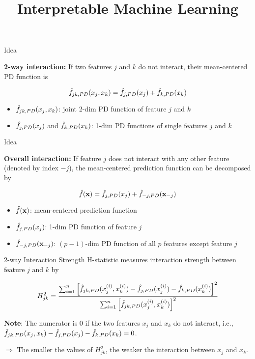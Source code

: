\documentclass[10pt,compress,t,notes=noshow, xcolor=table]{beamer}
\title{Interpretable Machine Learning}
\date{}
\begin{document}


\begin{frame}{Idea }

    \textbf{2-way interaction:} If two features $j$ and $k$ do not interact, their mean-centered PD function is

	$$\hat{f}_{jk, PD}(x_j, x_k) = \hat{f}_{j, PD}(x_j) + \hat{f}_{k, PD}(x_k)$$

\begin{itemize}
	\item $\hat{f}_{jk, PD}(x_j, x_k)$: joint 2-dim PD function of feature $j$ and $k$
	\item $\hat{f}_{j, PD}(x_j)$ and $\hat{f}_{k, PD}(x_k)$: 1-dim PD functions of single features $j$ and $k$
\end{itemize}

\end{frame}
\begin{frame}{Idea}

	\textbf{Overall interaction:} If feature $j$ does not interact with any other feature (denoted by index $-j$), the mean-centered prediction function can be decomposed by

	$$\hat{f}(\mathbf{x}) = \hat{f}_{j, PD}(x_j) +  \hat{f}_{-j, PD}(\mathbf{x}_{-j})$$

\begin{itemize}
	\item $\hat{f}(\mathbf{x})$: mean-centered prediction function
	\item $\hat{f}_{j, PD}(x_j)$: 1-dim PD function of feature $j$
	\item $\hat{f}_{-j, PD}(\mathbf{x}_{-j})$: $(p-1)$-dim PD function of all $p$ features except feature $j$
\end{itemize}
\end{frame}

\begin{frame}{2-way Interaction Strength}
H-statistic measures interaction strength between feature $j$ and $k$ by

	$$H^2_{jk} = \frac{\sum_{i=1}^n\left[\hat{f}_{jk,PD}(x_j^{(i)}, x_k^{(i)}) - \hat{f}_{j, PD}(x_j^{(i)}) - \hat{f}_{k, PD}(x_k^{(i)})  \right]^2}{\sum_{i=1}^n \left[\hat{f}_{jk,PD}(x_j^{(i)}, x_k^{(i)}) \right]^2}$$

\textbf{Note}: The numerator is $0$ if the two features $x_j$ and $x_k$ do not interact, i.e., $\hat{f}_{jk, PD}(x_j, x_k) - \hat{f}_{j, PD}(x_j) - \hat{f}_{k, PD}(x_k) = 0$.

$\Rightarrow$ The smaller the values of $H^2_{jk}$, the weaker the interaction between $x_j$ and $x_k$.



\end{frame}
\end{document}
